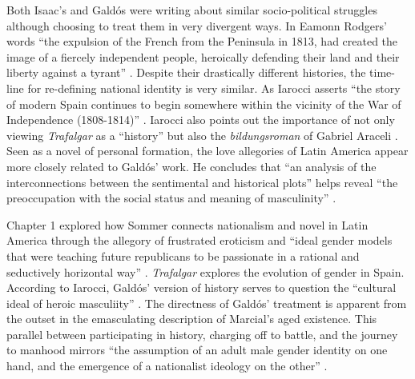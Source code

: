 \documentclass[12pt]{report}
\begin{document}
Both Isaac's and Galdós were writing about similar socio-political struggles although choosing to treat them in very divergent ways.
In Eamonn Rodgers' words \enquote{the expulsion of the French from the Peninsula in 1813, had created the image of a fiercely independent people, heroically defending their land and their liberty against a tyrant} \cite[465]{Rodgers2005}.
Despite their drastically different histories, the time-line for re-defining national identity is very similar.
As Iarocci asserts \enquote{the story of modern Spain continues to begin somewhere within the vicinity of the War of Independence (1808-1814)} \cite[185]{Iarocci2003}.
Iarocci also points out the importance of not only viewing \textit{Trafalgar} as a \enquote{history} but also the \textit{bildungsroman} of Gabriel Araceli \cite[189]{Iarocci2003}.
Seen as a novel of personal formation, the love allegories of Latin America appear more closely related to Galdós' work.
He concludes that \enquote{an analysis of the interconnections between the sentimental and historical plots} helps reveal \enquote{the preoccupation with the social status and meaning of masculinity} \cite[190]{Iarocci2003}.


Chapter 1 explored how Sommer connects nationalism and novel in Latin America through the allegory of frustrated eroticism and \enquote{ideal gender models that were teaching future republicans to be passionate in a rational and seductively horizontal way} \cite[191]{Iarocci2003}. 
\textit{Trafalgar} explores the evolution of gender in Spain.
According to Iarocci, Galdós' version of history serves to question the \enquote{cultural ideal of heroic masculiity} \cite[191]{Iarocci2003}.
The directness of Galdós' treatment is apparent from the outset in the emasculating description of Marcial's aged existence.
This parallel between participating in history, charging off to battle, and the journey to manhood mirrors \enquote{the assumption of an adult male gender identity on one hand, and the emergence of a nationalist ideology on the other} \cite[193]{Iarocci2003}.
\end{document}
